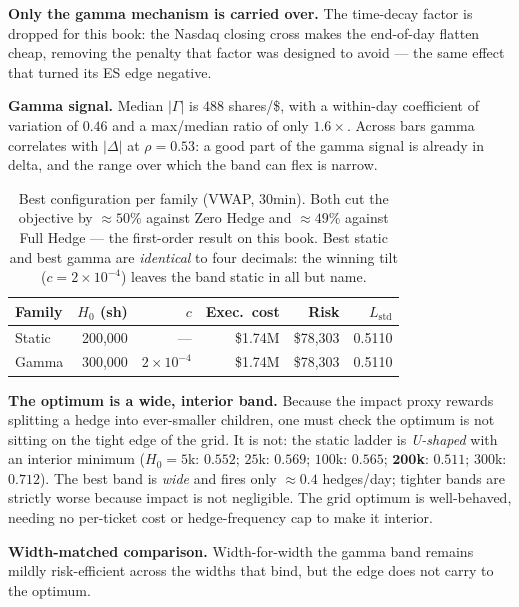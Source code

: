 \documentclass{article}
\begin{document}
\textbf{Only the gamma mechanism is carried over.} The time-decay factor is dropped for
this book: the Nasdaq closing cross makes the end-of-day flatten cheap, removing the
penalty that factor was designed to avoid --- the same effect that turned its ES edge
negative.

\textbf{Gamma signal.} Median $\lvert\Gamma\rvert$ is $488$ shares/\$, with a within-day
coefficient of variation of $0.46$ and a max/median ratio of only $1.6\times$. Across bars
gamma correlates with $\lvert\Delta\rvert$ at $\rho = 0.53$: a good part of the gamma signal
is already in delta, and the range over which the band can flex is narrow.

\begin{table}[htbp]
\centering
\small
\begin{tabular}{lrrrrr}
\toprule
\textbf{Family} & $H_0$ (sh) & $c$ & \textbf{Exec.\ cost} & \textbf{Risk} & $L_{\text{std}}$ \\
\midrule
Static & 200{,}000 & ---                & \$1.74M & \$78{,}303 & 0.5110 \\
Gamma  & 300{,}000 & $2\times10^{-4}$   & \$1.74M & \$78{,}303 & 0.5110 \\
\bottomrule
\end{tabular}
\caption{Best configuration per family (VWAP, 30min). Both cut the objective by
$\approx50\%$ against Zero Hedge and $\approx49\%$ against Full Hedge --- the first-order
result on this book. Best static and best gamma are \emph{identical} to four decimals: the
winning tilt ($c = 2\times10^{-4}$) leaves the band static in all but name.}
\end{table}

\begin{whybox}
\textbf{The optimum is a wide, interior band.} Because the impact proxy rewards splitting a
hedge into ever-smaller children, one must check the optimum is not sitting on the tight edge
of the grid. It is not: the static ladder is \emph{U-shaped} with an interior minimum
($H_0 = 5$k: $0.552$; $25$k: $0.569$; $100$k: $0.565$; $\mathbf{200}$\textbf{k}:
$\mathbf{0.511}$; $300$k: $0.712$). The best band is \emph{wide} and fires only $\approx0.4$
hedges/day; tighter bands are strictly worse because impact is not negligible. The grid
optimum is well-behaved, needing no per-ticket cost or hedge-frequency cap to make it interior.
\end{whybox}

\textbf{Width-matched comparison.} Width-for-width the gamma band remains mildly
risk-efficient across the widths that bind, but the edge does not carry to the optimum.
\end{document}
